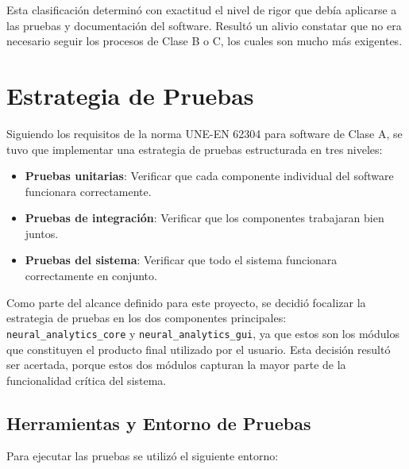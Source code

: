 Esta clasificación determinó con exactitud el nivel de rigor que debía aplicarse a las pruebas y documentación del software. Resultó un alivio constatar que no era necesario seguir los procesos de Clase B o C, los cuales son mucho más exigentes.

\section{Estrategia de Pruebas}

Siguiendo los requisitos de la norma UNE-EN 62304 para software de Clase A, se tuvo que implementar una estrategia de pruebas estructurada en tres niveles:

\begin{itemize}
    \item \textbf{Pruebas unitarias}: Verificar que cada componente individual del software funcionara correctamente.
    \item \textbf{Pruebas de integración}: Verificar que los componentes trabajaran bien juntos.
    \item \textbf{Pruebas del sistema}: Verificar que todo el sistema funcionara correctamente en conjunto.
\end{itemize}

Como parte del alcance definido para este proyecto, se decidió focalizar la estrategia de pruebas en los dos componentes principales: \texttt{neural\_analytics\_core} y \texttt{neural\_analytics\_gui}, ya que estos son los módulos que constituyen el producto final utilizado por el usuario. Esta decisión resultó ser acertada, porque estos dos módulos capturan la mayor parte de la funcionalidad crítica del sistema.

\subsection{Herramientas y Entorno de Pruebas}

Para ejecutar las pruebas se utilizó el siguiente entorno:

